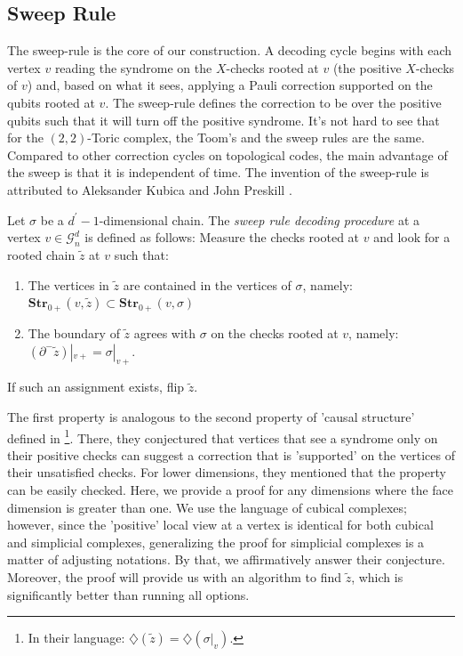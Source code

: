 



\subsection{Sweep Rule}

The sweep-rule is the core of our construction. A decoding cycle begins with each vertex $v$ reading the syndrome on the $X$-checks rooted at $v$ (the positive $X$-checks of $v$) and, based on what it sees, applying a Pauli correction supported on the qubits rooted at $v$. The sweep-rule defines the correction to be over the positive qubits such that it will turn off the positive syndrome. It's not hard to see that for the $(2,2)$-Toric complex, the Toom's and the sweep rules are the same. Compared to other correction cycles on topological codes, the main advantage of the sweep is that it is independent of time. The invention of the sweep-rule is attributed to Aleksander Kubica and John Preskill \cite{Kubica_2019}. 

\begin{definition}
  \label{def:sweeprule}
  Let $\sigma$ be a $d^{\prime}-1$-dimensional chain. The \textit{sweep rule decoding procedure} at a vertex $v \in \mathcal{G}_{n}^{d}$ is defined as follows: Measure the checks rooted at $v$ and look for a rooted chain $\tilde{z}$ at $v$ such that: 
  \begin{enumerate}
    \item The vertices in $\tilde{z}$ are contained in the vertices of $\sigma$, namely: $ \mathbf{Str}_{0+}(v, \tilde{z}) \subset \mathbf{Str}_{0+}(v, \sigma)$ %
    \item The boundary of $\tilde{z}$ agrees with $\sigma$ on the checks rooted at $v$, namely: $(\partial^{-}\tilde{z})|_{v+} = \sigma|_{v+}$.
  \end{enumerate}
  If such an assignment exists, flip $\tilde{z}$.
\end{definition}

The first property is analogous to the second property of 'causal structure' defined in \cite{Kubica_2019}\footnote{In their language: $\diamondsuit(\tilde{z}) = \diamondsuit(\sigma|_{v})$.}. There, they conjectured that vertices that see a syndrome only on their positive checks can suggest a correction that is 'supported' on the vertices of their unsatisfied checks. For lower dimensions, they mentioned that the property can be easily checked. Here, we provide a proof for any dimensions where the face dimension is greater than one. We use the language of cubical complexes; however, since the 'positive' local view at a vertex is identical for both cubical and simplicial complexes, generalizing the proof for simplicial complexes is a matter of adjusting notations. By that, we affirmatively answer their conjecture. Moreover, the proof will provide us with an algorithm to find $\tilde{z}$, which is significantly better than running all options.

